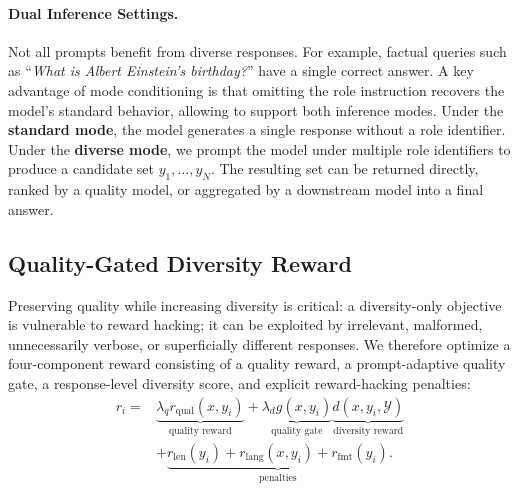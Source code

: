 \paragraph{Dual Inference Settings.} \label{sec:inference_modes} Not all prompts benefit from diverse responses. For example, factual queries such as ``\textit{What is Albert Einstein's birthday?}'' have a single correct answer. A key advantage of mode conditioning is that omitting the role instruction recovers the model's standard behavior, allowing \method{} to support both inference modes. Under the \textbf{standard mode}, the model generates a single response without a role identifier. Under the \textbf{diverse mode}, we prompt the model under multiple role identifiers to produce a candidate set ${y_1,\ldots,y_N}$. The resulting set can be returned directly, ranked by a quality model, or aggregated by a downstream model into a final answer.


\subsection{Quality-Gated Diversity Reward}
\label{subsec:qgdr}

Preserving quality while increasing diversity is critical: a diversity-only objective is vulnerable to reward hacking; it can be exploited by irrelevant, malformed, unnecessarily verbose, or superficially different responses. We therefore optimize a four-component reward consisting of a quality reward, a prompt-adaptive quality gate, a response-level diversity score, and explicit reward-hacking penalties:
\begin{equation}
\begin{aligned}
r_i
={}&
\underbrace{\lambda_q r_{\mathrm{qual}}(x,y_i)}_{\text{quality reward}}
+
\underbrace{\lambda_d g(x,y_i)}_{\text{quality gate}}
\underbrace{d(x,y_i,\mathcal{Y})}_{\text{diversity reward}} \\
&+
\underbrace{
r_{\mathrm{len}}(y_i)
+r_{\mathrm{lang}}(x,y_i)
+r_{\mathrm{fmt}}(y_i)
}_{\text{penalties}} .
\end{aligned}
\label{eq:qgdr}
\end{equation}

